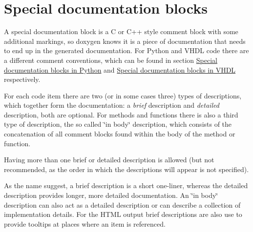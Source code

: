 \hypertarget{docblocks_specialblock}{}\section{Special documentation blocks}\label{docblocks_specialblock}
A special documentation block is a C or C++ style comment block with some additional markings, so doxygen knows it is a piece of documentation that needs to end up in the generated documentation. For Python and VHDL code there are a different comment conventions, which can be found in section \hyperlink{docblocks_pythonblocks}{Special documentation blocks in Python} and \hyperlink{docblocks_vhdlblocks}{Special documentation blocks in VHDL} respectively.

For each code item there are two (or in some cases three) types of descriptions, which together form the documentation: a {\em brief\/} description and {\em detailed\/} description, both are optional. For methods and functions there is also a third type of description, the so called \char`\"{}in body\char`\"{} description, which consists of the concatenation of all comment blocks found within the body of the method or function.

Having more than one brief or detailed description is allowed (but not recommended, as the order in which the descriptions will appear is not specified).

As the name suggest, a brief description is a short one-liner, whereas the detailed description provides longer, more detailed documentation. An \char`\"{}in body\char`\"{} description can also act as a detailed description or can describe a collection of implementation details. For the HTML output brief descriptions are also use to provide tooltips at places where an item is referenced.

